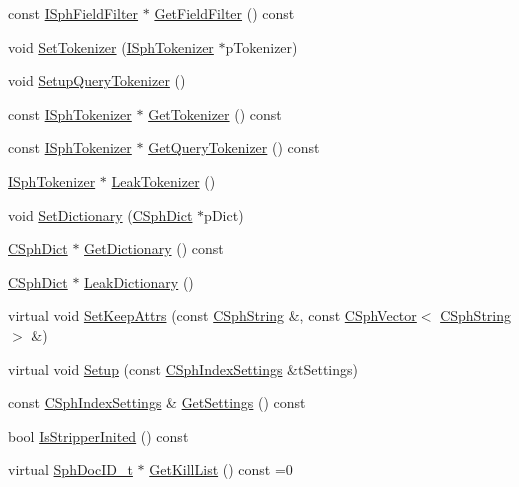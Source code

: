 \begin{DoxyCompactItemize}
const \hyperlink{classISphFieldFilter}{I\-Sph\-Field\-Filter} $\ast$ \hyperlink{classCSphIndex_a49c281f03d88d1da574cc3c953d3f382}{Get\-Field\-Filter} () const 
\item 
void \hyperlink{classCSphIndex_a7b6744be748d7d1ba9df421e19fe28eb}{Set\-Tokenizer} (\hyperlink{classISphTokenizer}{I\-Sph\-Tokenizer} $\ast$p\-Tokenizer)
\item 
void \hyperlink{classCSphIndex_a54e7ce1b62ae40487056ede59951513e}{Setup\-Query\-Tokenizer} ()
\item 
const \hyperlink{classISphTokenizer}{I\-Sph\-Tokenizer} $\ast$ \hyperlink{classCSphIndex_a3dc8300c4e9f96f92b71ded940b9cdcd}{Get\-Tokenizer} () const 
\item 
const \hyperlink{classISphTokenizer}{I\-Sph\-Tokenizer} $\ast$ \hyperlink{classCSphIndex_a8601b540757cf4a1995a16a5399119d5}{Get\-Query\-Tokenizer} () const 
\item 
\hyperlink{classISphTokenizer}{I\-Sph\-Tokenizer} $\ast$ \hyperlink{classCSphIndex_ab32571bf675623d86e79c05fa7e00f9f}{Leak\-Tokenizer} ()
\item 
void \hyperlink{classCSphIndex_ae0d4e0871189900c8556bdacbddb54e9}{Set\-Dictionary} (\hyperlink{classCSphDict}{C\-Sph\-Dict} $\ast$p\-Dict)
\item 
\hyperlink{classCSphDict}{C\-Sph\-Dict} $\ast$ \hyperlink{classCSphIndex_a06f52c4dfb0ee237945da8cd899e5321}{Get\-Dictionary} () const 
\item 
\hyperlink{classCSphDict}{C\-Sph\-Dict} $\ast$ \hyperlink{classCSphIndex_a9d747772357ef3dadfc89958309428ee}{Leak\-Dictionary} ()
\item 
virtual void \hyperlink{classCSphIndex_aae305c037dc11dcb8ca0758474d3bb51}{Set\-Keep\-Attrs} (const \hyperlink{structCSphString}{C\-Sph\-String} \&, const \hyperlink{classCSphVector}{C\-Sph\-Vector}$<$ \hyperlink{structCSphString}{C\-Sph\-String} $>$ \&)
\item 
virtual void \hyperlink{classCSphIndex_a6be80ead63119efb694f48c930bf12cd}{Setup} (const \hyperlink{structCSphIndexSettings}{C\-Sph\-Index\-Settings} \&t\-Settings)
\item 
const \hyperlink{structCSphIndexSettings}{C\-Sph\-Index\-Settings} \& \hyperlink{classCSphIndex_a2a4ed1e7d56b6788f307f97f2cc00521}{Get\-Settings} () const 
\item 
bool \hyperlink{classCSphIndex_af962ca874941d936e1a70d9da8e1a2c5}{Is\-Stripper\-Inited} () const 
\item 
virtual \hyperlink{sphinx_8h_a3176771631c12a9e4897272003e6b447}{Sph\-Doc\-I\-D\-\_\-t} $\ast$ \hyperlink{classCSphIndex_a742881b516501e4a60830a7051be32ef}{Get\-Kill\-List} () const =0

\end{DoxyCompactItemize}
